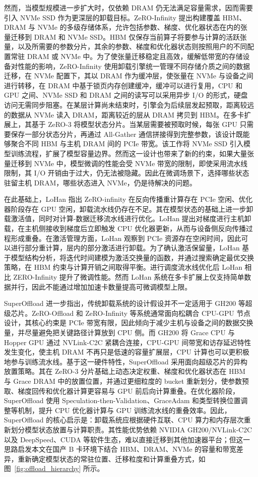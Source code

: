 \documentclass[bachelor,openany,oneside,color,AutoFakeBold=true]{buaathesis}
\begin{document}
然而，当模型规模进一步扩大时，仅依赖 DRAM 仍无法满足容量需求，因而需要引入 NVMe SSD 作为更深层的卸载目标。ZeRO-Infinity 提出构建覆盖 HBM、DRAM 与 NVMe 的多级存储体系，允许包括参数、梯度、优化器状态在内的张量迁移到 DRAM 和 NVMe SSD。HBM 仅保存当前算子将要参与计算的活跃张量，以及所需要的参数分片，其余的参数、梯度和优化器状态则按照用户的不同配置常驻 DRAM 或 NVMe 中。为了使张量迁移稳定且高效，缓解低带宽的存储设备对性能的影响，ZeRO-Infinity 使用卸载引擎统一管理不同存储介质之间的数据迁移，在 NVMe 配置下，其以 DRAM 作为缓冲层，使张量在 NVMe 与设备之间进行转移，在 DRAM 中基于锁页内存创建缓冲，缓冲可以进行复用，CPU 和 GPU 之间、NVMe SSD 和 DRAM 之间的读写可以采用异步 I/O 的形式，硬盘访问无需同步阻塞。在某层计算尚未结束时，引擎会为后续层发起预取，距离较远的数据从 NVMe 读入 DRAM，距离较近的层从 DRAM 拷贝到 HBM。在多卡扩展上，其基于 ZeRO-3 将模型状态分片。当某层需要被预取时候，每张 GPU 只需要保存一部分状态分片，再通过 All-Gather 通信拼接得到完整参数，该设计既能够聚合不同 HBM 与主机 DRAM 间的 PCIe 带宽。该工作将 NVMe SSD 引入模型训练流程，扩展了模型容量边界。然而这一设计也带来了新的约束，如果大量张量迁移到 NVMe 中，模型微调的性能会受 NVMe 带宽的限制，即使采用流水线限制，其 I/O 开销由于过大，仍无法被隐藏。因此在微调场景下，选择哪些状态驻留主机 DRAM，哪些状态进入 NVMe，仍是待解决的问题。

在此基础上，LoHan 指出 ZeRO-infinity 在反向传播重计算存在 PCIe 空闲、优化器阶段存在 GPU 空闲，卸载流水线仍存在不足。其在模型状态的基础上进一步卸载激活值，同时对计算-数据迁移流水线进行优化。LoHan 提出对梯度进行主机卸载，在主机侧接收到梯度后立即触发 CPU 优化器更新，从而与设备侧反向传播过程形成重叠。在激活管理方面，LoHan 观察到 PCIe 资源存在空闲时间，因此可以进行部分重计算，层内的部分激活进行卸载。为了确认激活保留量，LoHan 基于模型结构分析，将迭代时间建模为激活交换量的函数，并通过搜索确定最优交换策略，在 HBM 约束与计算开销之间取得平衡。进行调度流水线优化后 LoHan 相比 ZERO-Infinity 提升了微调性能。然而 LoHan 系统在多卡扩展上仅支持简单数据并行，因此不能通过增加加速卡数量提高可微调模型上限。

SuperOffload 进一步指出，传统卸载系统的设计假设并不一定适用于 GH200 等超级芯片。ZeRO-Offload 和 ZeRO-Infinity 等系统通常面向松耦合 CPU-GPU 节点设计，其核心约束是 PCIe 带宽有限，因此倾向于减少主机与设备之间的数据交换量，并尽量避免把关键路径计算放到 CPU 侧。而 GH200 将 Grace CPU 与 Hopper GPU 通过 NVLink-C2C 紧耦合连接，CPU-GPU 间带宽和访存延迟特性发生变化，使主机 DRAM 不再只是低速的容量扩展层，CPU 计算也可以更积极地参与训练流水线。基于这一硬件特性，SuperOffload 采用面向超级芯片的异构放置策略。其在 ZeRO-3 分片基础上动态决定权重、梯度和优化器状态在 HBM 与 Grace DRAM 中的放置位置，并通过更细粒度的 bucket 重新划分，使参数预取、梯度回传和优化器计算更容易与 GPU 前后向计算重叠。在优化器阶段，SuperOffload 使用 Speculation-then-Validation、GraceAdam 和类型转换位置调整等机制，提升 CPU 优化器计算与 GPU 训练流水线的重叠效率。因此，SuperOffload 的核心启示是：卸载系统应根据硬件互联、CPU 算力和内存层次重新划分模型状态放置与计算职责。其性能优势依赖 NVIDIA GH200/NVLink-C2C 以及 DeepSpeed、CUDA 等软件生态，难以直接迁移到其他加速器平台；但这一思路启发本文在国产 B 卡环境下结合 HBM、DRAM、NVMe 的容量和带宽差异，重新确定模型状态的常驻位置、迁移粒度和计算重叠方式，如图~\ref{fig:offload_hierarchy} 所示。
\end{document}
